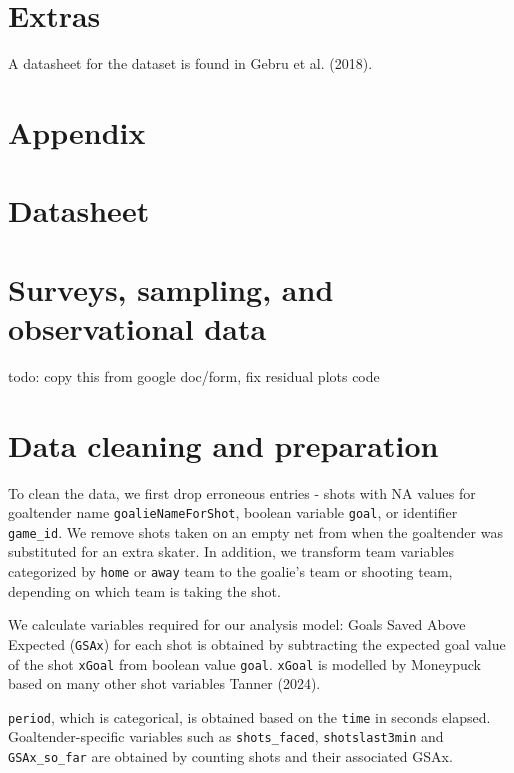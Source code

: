 \documentclass[
  letterpaper,
  DIV=11,
  numbers=noendperiod]{scrartcl}
\begin{document}
\section{Extras}\label{extras}

A datasheet for the dataset is found in Gebru et al. (2018).

\newpage

\appendix

\section*{Appendix}\label{appendix}

\section{Datasheet}\label{sec-datasheet}

\section{Surveys, sampling, and observational
data}\label{surveys-sampling-and-observational-data}

todo: copy this from google doc/form, fix residual plots code

\section{Data cleaning and preparation}\label{sec-appendix-a}

To clean the data, we first drop erroneous entries - shots with NA
values for goaltender name \texttt{goalieNameForShot}, boolean variable
\texttt{goal}, or identifier \texttt{game\_id}. We remove shots taken on
an empty net from when the goaltender was substituted for an extra
skater. In addition, we transform team variables categorized by
\texttt{home} or \texttt{away} team to the goalie's team or shooting
team, depending on which team is taking the shot.

We calculate variables required for our analysis model: Goals Saved
Above Expected (\texttt{GSAx}) for each shot is obtained by subtracting
the expected goal value of the shot \texttt{xGoal} from boolean value
\texttt{goal}. \texttt{xGoal} is modelled by Moneypuck based on many
other shot variables Tanner (2024).

\texttt{period}, which is categorical, is obtained based on the
\texttt{time} in seconds elapsed. Goaltender-specific variables such as
\texttt{shots\_faced}, \texttt{shotslast3min} and \texttt{GSAx\_so\_far}
are obtained by counting shots and their associated GSAx.
\end{document}
